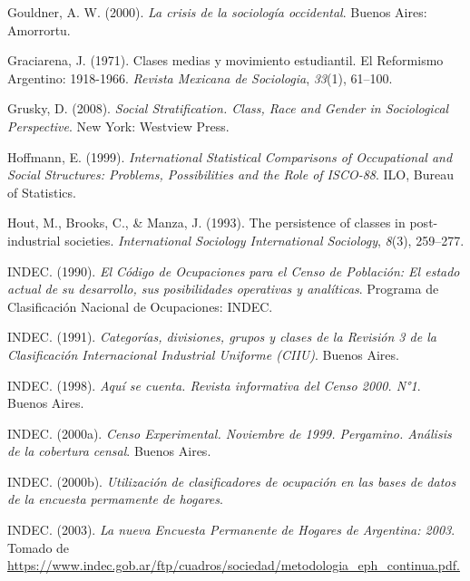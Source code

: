 \documentclass[
]{article}
\newlength{\cslhangindent}
\newlength{\cslentryspacingunit} %
\newenvironment{CSLReferences}[2] %
 {%
  \setlength{\parindent}{0pt}
  \ifodd #1
  \let\oldpar\par
  \def\par{\hangindent=\cslhangindent\oldpar}
  \fi
  \setlength{\parskip}{#2\cslentryspacingunit}
 }%
 {}
\begin{document}
\begin{CSLReferences}{1}{0}
\leavevmode{}%
Gouldner, A. W. (2000). \emph{La crisis de la sociología occidental}. Buenos Aires: Amorrortu.

\leavevmode{}%
Graciarena, J. (1971). Clases medias y movimiento estudiantil. {El} {Reformismo} {Argentino}: 1918-1966. \emph{Revista Mexicana de Sociologia}, \emph{33}(1), 61--100.

\leavevmode{}%
Grusky, D. (2008). \emph{Social {Stratification}. {Class}, {Race} and {Gender} in {Sociological} {Perspective}}. New York: Westview Press.

\leavevmode{}%
Hoffmann, E. (1999). \emph{International {Statistical} {Comparisons} of {Occupational} and {Social} {Structures}: {Problems}, {Possibilities} and the {Role} of {ISCO}-88}. ILO, Bureau of Statistics.

\leavevmode{}%
Hout, M., Brooks, C., \& Manza, J. (1993). The persistence of classes in post-industrial societies. \emph{International Sociology International Sociology}, \emph{8}(3), 259--277.

\leavevmode{}%
INDEC. (1990). \emph{El {Código} de {Ocupaciones} para el {Censo} de {Población}: El estado actual de su desarrollo, sus posibilidades operativas y analíticas}. Programa de Clasificación Nacional de Ocupaciones: INDEC.

\leavevmode{}%
INDEC. (1991). \emph{Categorías, divisiones, grupos y clases de la {Revisión} 3 de la {Clasificación} {Internacional} {Industrial} {Uniforme} ({CIIU})}. Buenos Aires.

\leavevmode{}%
INDEC. (1998). \emph{Aquí se cuenta. {Revista} informativa del {Censo} 2000. {N}°1}. Buenos Aires.

\leavevmode{}%
INDEC. (2000a). \emph{Censo {Experimental}. {Noviembre} de 1999. {Pergamino}. {Análisis} de la cobertura censal}. Buenos Aires.

\leavevmode{}%
INDEC. (2000b). \emph{Utilización de clasificadores de ocupación en las bases de datos de la encuesta permamente de hogares}.

\leavevmode{}%
INDEC. (2003). \emph{La nueva {Encuesta} {Permanente} de {Hogares} de {Argentina}: 2003}. Tomado de \href{https://www.indec.gob.ar/ftp/cuadros/sociedad/metodologia_eph_continua.pdf}{https://www.indec.gob.ar/ftp/cuadros/sociedad/metodologia\_eph\_continua.pdf.}


\end{CSLReferences}
\end{document}
